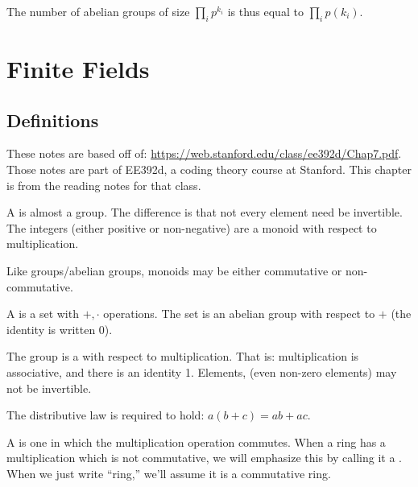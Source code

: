 \begin{remark}
  The number of abelian groups of size $\prod_i p^{k_i}$ is thus equal
  to $\prod_i p(k_i)$.
\end{remark}

\clearpage
\section{Finite Fields}

\subsection{Definitions}

\begin{remark}
  These notes are based off of:
  \url{https://web.stanford.edu/class/ee392d/Chap7.pdf}. Those notes are
  part of EE392d, a coding theory course at Stanford. This chapter is
  from the reading notes for that class.
\end{remark}

\begin{definition}
  A  is almost a group. The difference is that not every
  element need be invertible. The integers (either positive or
  non-negative) are a monoid with respect to multiplication.

  Like groups/abelian groups, monoids may be either commutative or
  non-commutative.
\end{definition}

\begin{definition}
  A  is a set with $+, \cdot$ operations. The set is an
  abelian group with respect to $+$ (the identity is written 0).

  The group is a  with respect to multiplication. That
  is: multiplication is associative, and there is an identity 1.
  Elements, (even non-zero elements) may not be invertible.

  The distributive law is required to hold: $a(b + c) = ab + ac$.
\end{definition}

\begin{definition}
  A  is one in which the multiplication
  operation commutes. When a ring has a multiplication which is not
  commutative, we will emphasize this by calling it a
  . When we just write ``ring,'' we'll
  assume it is a commutative ring.
\end{definition}

